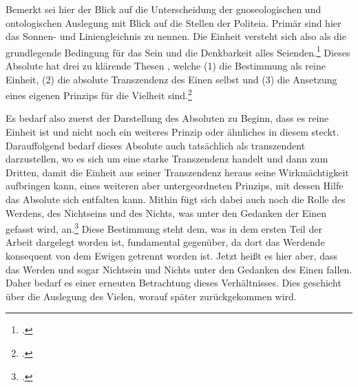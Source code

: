 Bemerkt sei hier der Blick auf die Unterscheidung der gnoseologischen und ontologischen Auslegung mit Blick auf die Stellen der Politeia. Primär sind hier das Sonnen- und Liniengleichnis zu nennen. 
Die Einheit versteht sich also als die grundlegende Bedingung für das Sein und die Denkbarkeit alles Seienden.\footcite[vgl.][S. 97]{halfwassen2015spuren} 
Dieses Absolute hat drei zu klärende Thesen 
, welche (1) die Bestimmung als reine Einheit, (2) die absolute Transzendenz des Einen selbst und (3) die Ansetzung eines eigenen Prinzips für die Vielheit sind.\footcite[vgl.][S. 96]{halfwassen2015spuren}


Es bedarf also zuerst der Darstellung des Absoluten zu Beginn, dass es reine Einheit ist und nicht noch ein weiteres Prinzip oder ähnliches in diesem steckt. Darauffolgend bedarf dieses Absolute auch tatsächlich als transzendent darzustellen, wo es sich um eine starke Transzendenz handelt und dann zum Dritten, damit die Einheit aus seiner Transzendenz heraus seine Wirkmächtigkeit aufbringen kann, eines weiteren aber untergeordneten Prinzips, mit dessen Hilfe das Absolute sich entfalten kann.
Mithin fügt sich dabei auch noch die Rolle des Werdens, des Nichtseins und des Nichts, was unter den Gedanken der Einen gefasst wird, an.\footcite[vgl.][S. 97]{halfwassen2015spuren} Diese Bestimmung steht dem, was in dem ersten Teil der Arbeit dargelegt worden ist, fundamental gegenüber, da dort das Werdende konsequent von dem Ewigen getrennt worden ist. Jetzt heißt es hier aber, dass das Werden und sogar Nichtsein und Nichts unter den Gedanken des Einen fallen. Daher bedarf es einer erneuten Betrachtung dieses Verhältnisses. Dies geschieht über die Auslegung des Vielen, worauf später zurückgekommen wird.



